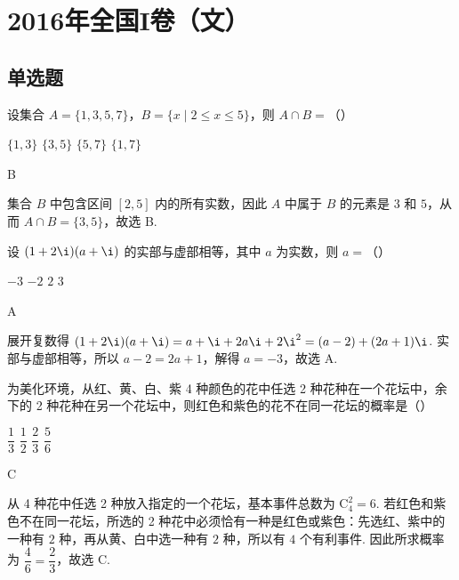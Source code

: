 
\chapter{2016年全国I卷（文）}

\section{单选题}

\begin{problem}
设集合 \(A=\{1,3,5,7\}\)，\(B=\{x\mid 2\le x\le 5\}\)，则 \(A\cap B=\)（\quad）

\choices
    {\(\{1,3\}\)}
    {\(\{3,5\}\)}
    {\(\{5,7\}\)}
    {\(\{1,7\}\)}
\end{problem}

\begin{answer}
B
\end{answer}

\begin{solution}
集合 \(B\) 中包含区间 \([2,5]\) 内的所有实数，因此 \(A\) 中属于 \(B\) 的元素是 \(3\) 和 \(5\)，从而 \(A\cap B=\{3,5\}\)，故选 B.
\end{solution}

\begin{problem}
设 \((1+2\i)(a+\i)\) 的实部与虚部相等，其中 \(a\) 为实数，则 \(a=\)（\quad）

\choices
    {\(-3\)}
    {\(-2\)}
    {\(2\)}
    {\(3\)}
\end{problem}

\begin{answer}
A
\end{answer}

\begin{solution}
展开复数得 \((1+2\i)(a+\i)=a+\i+2a\i+2\i^2=(a-2)+(2a+1)\i\). 实部与虚部相等，所以 \(a-2=2a+1\)，解得 \(a=-3\)，故选 A.
\end{solution}

\begin{problem}
为美化环境，从红、黄、白、紫 4 种颜色的花中任选 2 种花种在一个花坛中，余下的 2 种花种在另一个花坛中，则红色和紫色的花不在同一花坛的概率是（\quad）

\choices
    {\(\dfrac13\)}
    {\(\dfrac12\)}
    {\(\dfrac23\)}
    {\(\dfrac56\)}
\end{problem}

\begin{answer}
C
\end{answer}

\begin{solution}
从 4 种花中任选 2 种放入指定的一个花坛，基本事件总数为 \(\mathrm C_4^2=6\). 若红色和紫色不在同一花坛，所选的 2 种花中必须恰有一种是红色或紫色：先选红、紫中的一种有 \(2\) 种，再从黄、白中选一种有 \(2\) 种，所以有 \(4\) 个有利事件. 因此所求概率为 \(\dfrac{4}{6}=\dfrac23\)，故选 C.
\end{solution}

